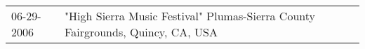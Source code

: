 \begin{supertabular}{ll}
 06-29-2006 &  "High Sierra Music Festival" Plumas-Sierra County Fairgrounds, Quincy, CA, USA \\
\end{supertabular}
